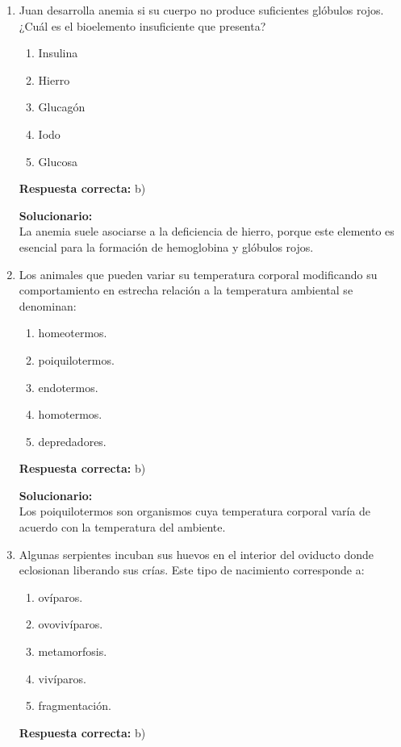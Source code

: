 \begin{enumerate}
	
	\item Juan desarrolla anemia si su cuerpo no produce suficientes glóbulos rojos. ¿Cuál es el bioelemento insuficiente que presenta?
	\begin{enumerate}[label=\alph*)]
		\item Insulina
		\item Hierro
		\item Glucagón
		\item Iodo
		\item Glucosa
	\end{enumerate}
	\textbf{Respuesta correcta:} b)
	
	\vspace{2mm}
	\textbf{Solucionario:}\\
	La anemia suele asociarse a la deficiencia de hierro, porque este elemento es esencial para la formación de hemoglobina y glóbulos rojos.
	
	\vspace{6mm}
	
	\item Los animales que pueden variar su temperatura corporal modificando su comportamiento en estrecha relación a la temperatura ambiental se denominan:
	\begin{enumerate}[label=\alph*)]
		\item homeotermos.
		\item poiquilotermos.
		\item endotermos.
		\item homotermos.
		\item depredadores.
	\end{enumerate}
	\textbf{Respuesta correcta:} b)
	
	\vspace{2mm}
	\textbf{Solucionario:}\\
	Los poiquilotermos son organismos cuya temperatura corporal varía de acuerdo con la temperatura del ambiente.
	
	\vspace{6mm}
	
	\item Algunas serpientes incuban sus huevos en el interior del oviducto donde eclosionan liberando sus crías. Este tipo de nacimiento corresponde a:
	\begin{enumerate}[label=\alph*)]
		\item ovíparos.
		\item ovovivíparos.
		\item metamorfosis.
		\item vivíparos.
		\item fragmentación.
	\end{enumerate}
	\textbf{Respuesta correcta:} b)
	

\end{enumerate}
